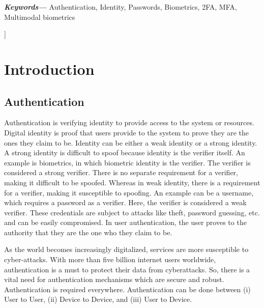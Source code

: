 \documentclass[10pt,journal,compsoc]{IEEEtran}
\providecommand{\keywords}[1]
{
  \small	
  \textbf{\textit{Keywords---}} #1
}
\begin{document}
\begin{@twocolumnfalse}
\begin{abstract}
    \end{abstract}
        \keywords{Authentication, Identity, Passwords, Biometrics, 2FA,
MFA, Multimodal biometrics}
 
  \end{@twocolumnfalse}
]



\section {Introduction}
\subsection{Authentication}

Authentication is verifying identity to provide access to the system or resources. Digital identity is proof that users provide to the system to prove they are the ones they claim to be. Identity can be either a weak identity or a strong identity. A strong identity is difficult to spoof because identity is the verifier itself. An example is biometrics, in which biometric identity is the verifier. The verifier is considered a strong verifier. There is no separate requirement for a verifier, making it difficult to be spoofed. Whereas in weak identity, there is a requirement for a verifier, making it susceptible to spoofing.
An example can be a username, which requires a password as a verifier. Here, the verifier is considered a weak verifier. These credentials are subject to attacks like theft, password guessing, etc. and can be easily compromised. In user authentication, the user proves to the authority that they are the one who they claim to be.
\par As the world becomes increasingly digitalized, services are more susceptible to cyber-attacks. With more than five billion internet users worldwide\cite{WinNT}, authentication is a must to protect their data from cyberattacks. So, there is a vital need for authentication mechanisms which are secure and robust. 
Authentication is required everywhere. Authentication can be done between (i) User to User, (ii) Device to Device, and (iii) User to Device.
\end{document}
